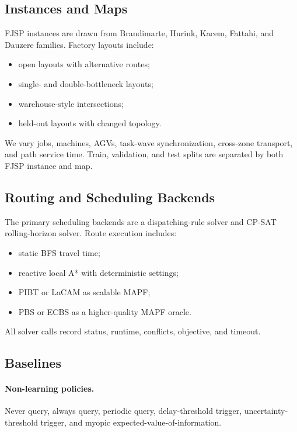 \documentclass[11pt,a4paper]{article}
\begin{document}
\subsection{Instances and Maps}

FJSP instances are drawn from Brandimarte, Hurink, Kacem, Fattahi, and Dauzere
families. Factory layouts include:

\begin{itemize}[leftmargin=*]
    \item open layouts with alternative routes;
    \item single- and double-bottleneck layouts;
    \item warehouse-style intersections;
    \item held-out layouts with changed topology.
\end{itemize}

We vary jobs, machines, AGVs, task-wave synchronization, cross-zone transport,
and path service time. Train, validation, and test splits are separated by both
FJSP instance and map.

\subsection{Routing and Scheduling Backends}

The primary scheduling backends are a dispatching-rule solver and CP-SAT
rolling-horizon solver. Route execution includes:

\begin{itemize}[leftmargin=*]
    \item static BFS travel time;
    \item reactive local A* with deterministic settings;
    \item PIBT or LaCAM as scalable MAPF;
    \item PBS or ECBS as a higher-quality MAPF oracle.
\end{itemize}

All solver calls record status, runtime, conflicts, objective, and timeout.

\subsection{Baselines}

\paragraph{Non-learning policies.}
Never query, always query, periodic query, delay-threshold trigger,
uncertainty-threshold trigger, and myopic expected-value-of-information.
\end{document}
